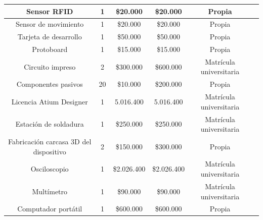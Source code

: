 \begin{landscape}
\begin{table}[H]
\begin{tabular}{|c|c|c|c|c|c|}
        Sensor RFID & 1& \$20.000& \$20.000 & Propia  \\ \hline
        Sensor de movimiento & 1& \$20.000& \$20.000 & Propia\\ \hline
        Tarjeta de desarrollo & 1& \$50.000& \$50.000 &  Propia\\ \hline
        Protoboard & 1& \$15.000& \$15.000 & Propia \\ \hline
        Circuito impreso& 2& \$300.000& \$600.000& Matrícula universitaria \\ \hline
        Componentes pasivos& 20& \$10.000& \$200.000& Propia\\ \hline
        Licencia Atium Designer& 1& 5.016.400& 5.016.400& Matrícula universitaria\\ \hline
        Estación de soldadura& 1& \$250.000& \$250.000& Matrícula universitaria\\ \hline
        Fabricación carcasa  3D del dispositivo& 2& \$150.000& \$300.000& Propia \\ \hline
        Osciloscopio& 1& \$2.026.400& \$2.026.400& Matrícula universitaria \\ \hline
        Multímetro& 1& \$90.000& \$90.000& Matrícula universitaria\\ \hline
        Computador portátil& 1& \$600.000& \$600.000&  Propia\\ \hline

\end{tabular}
\end{table}
\end{landscape}
